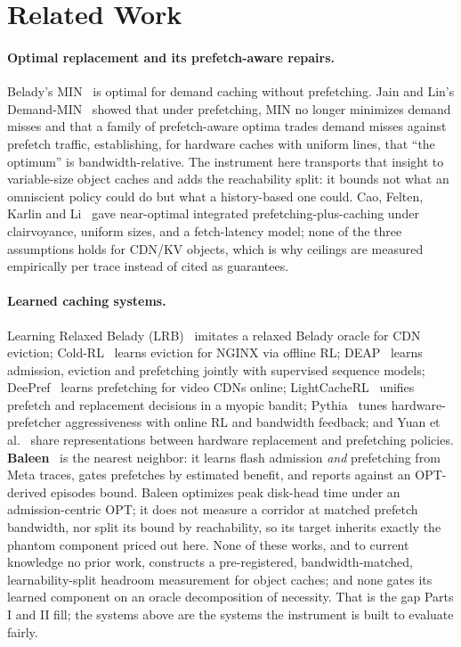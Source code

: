 \documentclass[11pt]{article}
\begin{document}
\section{Related Work}
\paragraph{Optimal replacement and its prefetch-aware repairs.} Belady's MIN~\cite{belady} is optimal for demand caching without prefetching. Jain and Lin's Demand-MIN~\cite{demandmin} showed that under prefetching, MIN no longer minimizes demand misses and that a family of prefetch-aware optima trades demand misses against prefetch traffic, establishing, for hardware caches with uniform lines, that ``the optimum'' is bandwidth-relative. The instrument here transports that insight to variable-size object caches and adds the reachability split: it bounds not what an omniscient policy could do but what a history-based one could. Cao, Felten, Karlin and Li~\cite{cao} gave near-optimal integrated prefetching-plus-caching under clairvoyance, uniform sizes, and a fetch-latency model; none of the three assumptions holds for CDN/KV objects, which is why ceilings are measured empirically per trace instead of cited as guarantees.

\paragraph{Learned caching systems.} Learning Relaxed Belady (LRB)~\cite{lrb} imitates a relaxed Belady oracle for CDN eviction; Cold-RL~\cite{coldrl} learns eviction for NGINX via offline RL; DEAP~\cite{deap} learns admission, eviction and prefetching jointly with supervised sequence models; DeePref~\cite{deepref} learns prefetching for video CDNs online; LightCacheRL~\cite{lightcache} unifies prefetch and replacement decisions in a myopic bandit; Pythia~\cite{pythia} tunes hardware-prefetcher aggressiveness with online RL and bandwidth feedback; and Yuan et al.~\cite{jointhw} share representations between hardware replacement and prefetching policies. \textbf{Baleen}~\cite{baleen} is the nearest neighbor: it learns flash admission \emph{and} prefetching from Meta traces, gates prefetches by estimated benefit, and reports against an OPT-derived episodes bound. Baleen optimizes peak disk-head time under an admission-centric OPT; it does not measure a corridor at matched prefetch bandwidth, nor split its bound by reachability, so its target inherits exactly the phantom component priced out here. None of these works, and to current knowledge no prior work, constructs a pre-registered, bandwidth-matched, learnability-split headroom measurement for object caches; and none gates its learned component on an oracle decomposition of necessity. That is the gap Parts I and II fill; the systems above are the systems the instrument is built to evaluate fairly.
\end{document}
